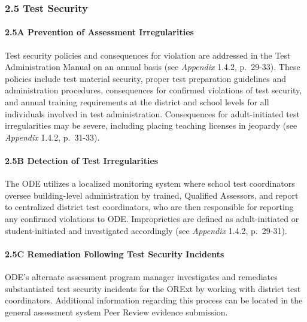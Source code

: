 \documentclass[]{article}
\let\oldparagraph\paragraph
\renewcommand{\paragraph}[1]{\oldparagraph{#1}\mbox{}}
\begin{document}
\hypertarget{test-security}{%
\subsubsection{2.5 Test Security}\label{test-security}}

\hypertarget{a-prevention-of-assessment-irregularities}{%
\paragraph{2.5A Prevention of Assessment
Irregularities}\label{a-prevention-of-assessment-irregularities}}

Test security policies and consequences for violation are addressed in
the Test Administration Manual on an annual basis (see \emph{Appendix}
1.4.2, p.~29-33). These policies include test material security, proper
test preparation guidelines and administration procedures, consequences
for confirmed violations of test security, and annual training
requirements at the district and school levels for all individuals
involved in test administration. Consequences for adult-initiated test
irregularities may be severe, including placing teaching licenses in
jeopardy (see \emph{Appendix} 1.4.2, p.~31-33).

\hypertarget{b-detection-of-test-irregularities}{%
\paragraph{2.5B Detection of Test
Irregularities}\label{b-detection-of-test-irregularities}}

The ODE utilizes a localized monitoring system where school test
coordinators oversee building-level administration by trained, Qualified
Assessors, and report to centralized district test coordinators, who are
then responsible for reporting any confirmed violations to ODE.
Improprieties are defined as adult-initiated or student-initiated and
investigated accordingly (see \emph{Appendix} 1.4.2, p.~29-31).

\hypertarget{c-remediation-following-test-security-incidents}{%
\paragraph{2.5C Remediation Following Test Security
Incidents}\label{c-remediation-following-test-security-incidents}}

ODE's alternate assessment program manager investigates and remediates
substantiated test security incidents for the ORExt by working with
district test coordinators. Additional information regarding this
process can be located in the general assessment system Peer Review
evidence submission.
\end{document}
